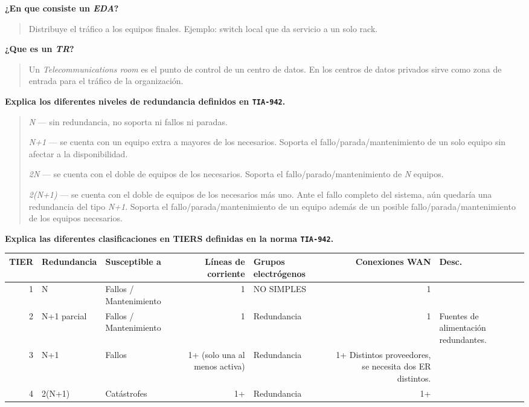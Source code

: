 \documentclass[11pt]{article}
\begin{document}
\textbf{¿En que consiste un \emph{EDA}?}
\begin{quote}
Distribuye el tráfico a los equipos finales.
Ejemplo: switch local que da servicio a un solo rack.
\end{quote}

\textbf{¿Que es un \emph{TR}?}
\begin{quote}
Un \emph{Telecommunications room} es el punto de control de un centro de datos. En los centros de datos privados sirve como zona de entrada para el tráfico de la organización.
\end{quote}

\textbf{Explica los diferentes niveles de redundancia definidos en \texttt{TIA-942}.}
\begin{quote}
\emph{N} ---  sin redundancia, no soporta ni fallos ni paradas.

\emph{N+1} --- se cuenta con un equipo extra a mayores de los necesarios. Soporta el fallo/parada/mantenimiento de un solo equipo sin afectar a la disponibilidad.

\emph{2N} --- se cuenta con el doble de equipos de los necesarios. Soporta el fallo/parado/mantenimiento de \emph{N} equipos.

\emph{2(N+1)} --- se cuenta con el doble de equipos de los necesarios más uno. Ante el fallo completo del sistema, aún quedaría una redundancia del tipo \emph{N+1}. Soporta el fallo/parada/mantenimiento de un equipo además de un posible fallo/parada/mantenimiento de los equipos necesarios.
\end{quote}

\textbf{Explica las diferentes clasificaciones en TIERS definidas en la norma \texttt{TIA-942}.}

\begin{adjustbox}{width=1.3\textwidth,center=\textwidth}
\begin{tabular}{rllrlrl}
TIER & Redundancia & Susceptible a & Líneas de corriente & Grupos electrógenos & Conexiones WAN & Desc.\\
\hline
1 & N & Fallos / Mantenimiento & 1 & NO SIMPLES & 1 & \\
2 & N+1 \guillemotleft{}parcial\guillemotright{} & Fallos / Mantenimiento & 1 & Redundancia & 1 & Fuentes de alimentación redundantes.\\
3 & N+1 & Fallos & 1+ (solo una al menos activa) & Redundancia & 1+ Distintos proveedores, se necesita dos ER distintos. & \\
4 & 2(N+1) & Catástrofes & 1+ & Redundancia & 1+ & \\
\end{tabular}
\end{adjustbox}
\end{document}
